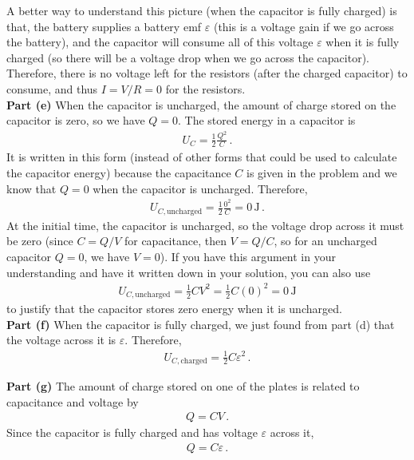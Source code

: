 \documentclass[11pt]{article}
\begin{document}
A better way to understand this picture (when the capacitor is fully charged) is that, the battery supplies a battery emf $\varepsilon$ (this is a voltage gain if we go across the battery), and the capacitor will consume all of this voltage $\varepsilon$ when it is fully charged (so there will be a voltage drop when we go across the capacitor). Therefore, there is no voltage left for the resistors (after the charged capacitor) to consume, and thus $I=V/R = 0$ for the resistors. \\



\noindent\textbf{Part (e)} When the capacitor is uncharged, the amount of charge stored on the capacitor is zero, so we have $Q=0$. The stored energy in a capacitor is
\begin{align*}
U_C = \frac{1}{2}\frac{Q^2}{C}\,.
\end{align*}
It is written in this form (instead of other forms that could be used to calculate the capacitor energy) because the capacitance $C$ is given in the problem and we know that $Q=0$ when the capacitor is uncharged. Therefore, 
\begin{align*}
U_{C,\text{uncharged}} = \frac{1}{2}\frac{0^2}{C} =0\,\text{J}\,.
\end{align*}
At the initial time, the capacitor is uncharged, so the voltage drop across it must be zero (since $C=Q/V$ for capacitance, then $V=Q/C$, so for an uncharged capacitor $Q=0$, we have $V = 0$). If you have this argument in your understanding and have it written down in your solution, you can also use
\begin{align*}
U_{C,\text{uncharged}} =\frac{1}{2}CV^2 =\frac{1}{2}C(0)^2 = 0\,\text{J}
\end{align*}
to justify that the capacitor stores zero energy when it is uncharged.\\


\noindent\textbf{Part (f)} When the capacitor is fully charged, we just found from part (d) that the voltage across it is $\varepsilon$. Therefore,
\begin{align*}
U_{C,\text{charged}} = \frac{1}{2}C\varepsilon^2\,.
\end{align*}

\noindent\textbf{Part (g)} The amount of charge stored on one of the plates is related to capacitance and voltage by
\begin{align*}
Q=CV\,.
\end{align*}
Since the capacitor is fully charged and has voltage $\varepsilon$ across it,
\begin{align*}
Q = C\varepsilon\,.
\end{align*}
\end{document}

